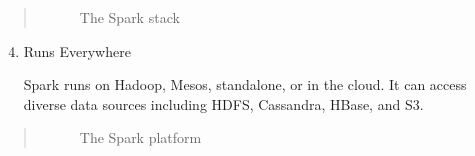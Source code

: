 \documentclass[letterpaper,11pt,english]{sphinxmanual}
\begin{document}
\begin{quote}
\begin{figure}[htbp]
\centering
\capstart

\caption{The Spark stack}\label{why:fig-stack}\end{figure}
\end{quote}
\begin{enumerate}
\setcounter{enumi}{3}
\item {} 
Runs Everywhere

Spark runs on Hadoop, Mesos, standalone, or in the cloud. It can access diverse data sources including HDFS, Cassandra, HBase, and S3.

\end{enumerate}
\begin{quote}
\begin{figure}[htbp]
\centering
\capstart

\caption{The Spark platform}\label{why:fig-runs}\end{figure}
\end{quote}
\end{document}
